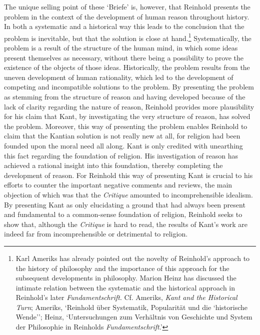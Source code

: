 The unique selling point of these `Briefe' is, however, that Reinhold presents the problem in the context of the development of human reason throughout history. In both a systematic and a historical way this leads to the conclusion that the problem is inevitable, but that the solution is close at hand.\footnote{ Karl Ameriks has already pointed out the novelty of Reinhold's approach to the history of philosophy and the importance of this approach for the subsequent developments in philosophy. Marion Heinz has discussed the intimate relation between the systematic and the historical approach in Reinhold's later \textit{Fundamentschrift}. Cf. Ameriks, \textit{Kant and the Historical Turn}; Ameriks, `Reinhold \"{u}ber Systematik, Popularit\"{a}t und die `historische Wende''; Heinz, `Untersuchungen zum Verh\"{a}ltnis von Geschichte und System der Philosophie in Reinholds \textit{Fundamentschrift}.' } Systematically, the problem is a result of the structure of the human mind, in which some ideas present themselves as necessary, without there being a possibility to prove the existence of the objects of those ideas. Historically, the problem results from the uneven development of human rationality, which led to the development of competing and incompatible solutions to the problem. By presenting the problem as stemming from the structure of reason and having developed because of the lack of clarity regarding the nature of reason, Reinhold provides more plausibility for his claim that Kant, by investigating the very structure of reason, has solved the problem. Moreover, this way of presenting the problem enables Reinhold to claim that the Kantian solution is not really new at all, for religion had been founded upon the moral need all along. Kant is only credited with unearthing this fact regarding the foundation of religion. His investigation of reason has achieved a rational insight into this foundation, thereby completing the development of reason. For Reinhold this way of presenting Kant is crucial to his efforts to counter the important negative comments and reviews, the main objection of which was that the \textit{Critique} amounted to incomprehensible idealism. By presenting Kant as only elucidating a ground that had always been present and fundamental to a common{-}sense foundation of religion, Reinhold seeks to show that, although the \textit{Critique }is hard to read, the results of Kant's work are indeed far from incomprehensible or detrimental to religion. 

